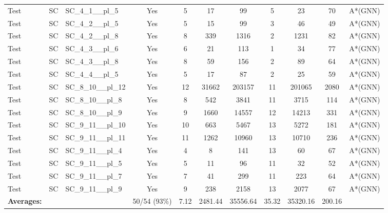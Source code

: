 \documentclass{article}
\begin{document}
\begin{tabular}{lllcccccccc}
Test & SC & SC\_4\_1\_\_pl\_5 & Yes & 5 & 17 & 99 & 5 & 23 & 70 & A*(GNN) \\
Test & SC & SC\_4\_2\_\_pl\_5 & Yes & 5 & 15 & 99 & 3 & 46 & 49 & A*(GNN) \\
Test & SC & SC\_4\_2\_\_pl\_8 & Yes & 8 & 339 & 1316 & 2 & 1231 & 82 & A*(GNN) \\
Test & SC & SC\_4\_3\_\_pl\_6 & Yes & 6 & 21 & 113 & 1 & 34 & 77 & A*(GNN) \\
Test & SC & SC\_4\_3\_\_pl\_8 & Yes & 8 & 59 & 156 & 2 & 89 & 64 & A*(GNN) \\
Test & SC & SC\_4\_4\_\_pl\_5 & Yes & 5 & 17 & 87 & 2 & 25 & 59 & A*(GNN) \\
Test & SC & SC\_8\_10\_\_pl\_12 & Yes & 12 & 31662 & 203157 & 11 & 201065 & 2080 & A*(GNN) \\
Test & SC & SC\_8\_10\_\_pl\_8 & Yes & 8 & 542 & 3841 & 11 & 3715 & 114 & A*(GNN) \\
Test & SC & SC\_8\_10\_\_pl\_9 & Yes & 9 & 1660 & 14557 & 12 & 14213 & 331 & A*(GNN) \\
Test & SC & SC\_9\_11\_\_pl\_10 & Yes & 10 & 663 & 5467 & 13 & 5272 & 181 & A*(GNN) \\
Test & SC & SC\_9\_11\_\_pl\_11 & Yes & 11 & 1262 & 10960 & 13 & 10710 & 236 & A*(GNN) \\
Test & SC & SC\_9\_11\_\_pl\_4 & Yes & 4 & 8 & 141 & 13 & 60 & 67 & A*(GNN) \\
Test & SC & SC\_9\_11\_\_pl\_5 & Yes & 5 & 11 & 96 & 11 & 32 & 52 & A*(GNN) \\
Test & SC & SC\_9\_11\_\_pl\_7 & Yes & 7 & 41 & 299 & 11 & 223 & 64 & A*(GNN) \\
Test & SC & SC\_9\_11\_\_pl\_9 & Yes & 9 & 238 & 2158 & 13 & 2077 & 67 & A*(GNN) \\
\textbf{Averages:} & & & 50/54 (93\%) & 7.12 & 2481.44 & 35556.64 & 35.32 & 35320.16 & 200.16 & \\
\bottomrule
\end{tabular}
\newpage
\end{document}
